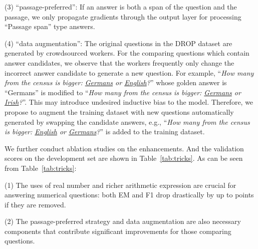 \documentclass[11pt,a4paper]{article}
\begin{document}
(3) ``passage-preferred'': If an answer is both a span of the question and the passage, we only propagate gradients through the output layer for processing ``Passage span'' type answers.

(4) ``data augmentation'': The original questions in the DROP dataset are generated by crowdsourced workers. For the comparing questions which contain answer candidates, we observe that the workers frequently only change the incorrect answer candidate to generate a new question. For example, ``\emph{How many from the census is bigger: \underline{Germans} or \underline{English}?}'' whose golden answer is ``Germans'' is modified to ``\emph{How many from the census is bigger: \underline{Germans} or \underline{Irish}?}''. This may introduce undesired inductive bias to the model. Therefore, we propose to augment the training dataset with new questions automatically generated by swapping the candidate answers, e.g., ``\emph{How many from the census is bigger: \underline{English} or \underline{Germans}?}'' is added to the training dataset.

We further conduct ablation studies on the enhancements. And the validation scores on the development set are shown in Table~\ref{tab:tricks}.
As can be seen from Table~\ref{tab:tricks}:

(1) The uses of real number and richer arithmetic expression are crucial for answering numerical questions: both EM and F1 drop drastically by up to  points if they are removed. 

(2) The passage-preferred strategy and data augmentation are also necessary components that contribute significant improvements for those comparing questions.
\end{document}
